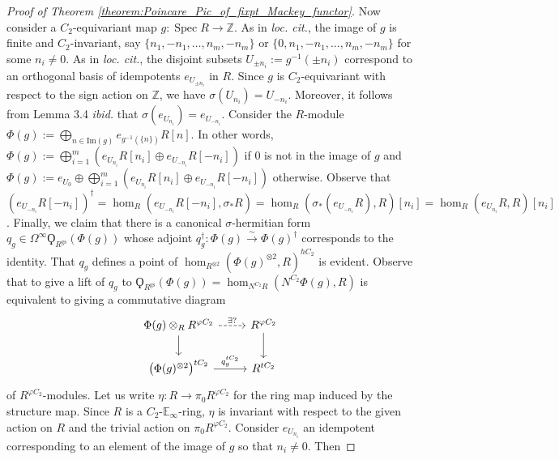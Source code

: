 \documentclass{article}
\DeclareMathOperator{\Spec}{Spec}
\newcommand{\ZZ}{\mathbb{Z}}
\newcommand{\EE}{\mathbb{E}}
\theoremstyle{definition}
\begin{document}
\begin{proof} [Proof of Theorem \ref{theorem:Poincare_Pic_of_fixpt_Mackey_functor}]
    Now consider a $ C_2 $-equivariant map $ g \colon \Spec R \to \ZZ $. 
    As in \emph{loc. cit.}, the image of $ g $ is finite and $ C_2 $-invariant, say $ \{n_1, -n_1, \ldots, n_m, -n_m\} $ or $ \{0, n_1, -n_1, \ldots, n_m, -n_m\} $ for some $ n_i \neq 0 $. 
    As in \emph{loc. cit.}, the disjoint subsets $ U_{\pm n_i} := g^{-1}(\pm n_i) $ correspond to an orthogonal basis of idempotents $ e_{U_{\pm n_i}} $ in $ R $. 
    Since $ g $ is $ C_2 $-equivariant with respect to the sign action on $ \ZZ $, we have $ \sigma(U_{n_i}) = U_{-n_i} $. 
    Moreover, it follows from Lemma 3.4 \emph{ibid.} that $ \sigma(e_{U_{n_i}}) = e_{U_{-n_i}} $. 
    Consider the $ R $-module $ \Phi(g):= \bigoplus_{n \in \mathrm{Im}(g)} e_{g^{-1}(\{n\})} R[n] $. 
    In other words, $ \Phi(g) := \bigoplus_{i=1}^m \left(e_{U_{n_i}}R[n_i] \oplus e_{U_{-n_i}}R[-n_i] \right) $ if $ 0 $ is not in the image of $ g $ and $ \Phi(g) := e_{U_0} \oplus \bigoplus_{i=1}^m \left(e_{U_{n_i}}R[n_i] \oplus e_{U_{-n_i}}R[-n_i] \right) $ otherwise. 
    Observe that $ \left(e_{U_{-n_i}}R[-n_i]\right)^\dag = \hom_R(e_{U_{-n_i}}R[-n_i], \sigma_* R)= \hom_R\left(\sigma_*(e_{U_{-n_i}}R), R\right)[n_i] = \hom_R\left(e_{U_{n_i}}R, R\right)[n_i] $. 
    Finally, we claim that there is a canonical $ \sigma $-hermitian form $ q_g \in \Omega^\infty \Qoppa_{R^{\mathrm{gs}}}(\Phi(g)) $ whose adjoint $ q_g^\dag \colon \Phi(g) \xrightarrow{\sim} \Phi(g)^\dag $ corresponds to the identity. 
    That $ q_g $ defines a point of $ \hom_{R^{\otimes 2}}(\Phi(g)^{\otimes 2}, R)^{hC_2} $ is evident. 
    Observe that to give a lift of $ q_g $ to $ \Qoppa_{R^{\mathrm{gs}}}(\Phi(g)) = \hom_{N^{C_2}R}\left(N^{C_2}\Phi(g), R\right) $ is equivalent to giving a commutative diagram
    \begin{equation}\label{diagram:lifting_sym_form_to_gen_sym_form}
    \begin{tikzcd}
        \Phi(g) \otimes_R R^{\varphi C_2} \ar[d] \ar[r,dashed,"{\exists ?}"] & R^{\varphi C_2} \ar[d] \\
        \left(\Phi(g)^{\otimes 2}\right)^{tC_2} \ar[r,"{q_g^{tC_2}}"] & R^{tC_2}
    \end{tikzcd} 
    \end{equation} 
    of $ R^{\varphi C_2} $-modules. 
    Let us write $ \eta \colon R \to \pi_0 R^{\varphi C_2} $ for the ring map induced by the structure map. 
    Since $ R $ is a $ C_2 $-$ \EE_\infty $-ring, $ \eta $ is invariant with respect to the given action on $ R $ and the trivial action on $ \pi_0 R^{\varphi C_2} $. 
    Consider $ e_{U_{n_i}} $ an idempotent corresponding to an element of the image of $ g $ so that $ n_i \neq 0 $. Then

\end{proof}
\end{document}
